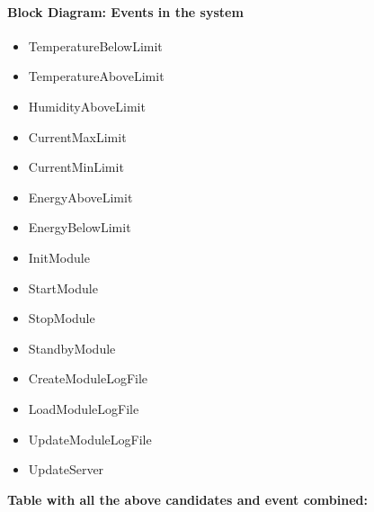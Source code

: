 			\paragraph{Block Diagram: Events in the system}
				\begin{itemize}
					\item TemperatureBelowLimit
					\item TemperatureAboveLimit
					\item HumidityAboveLimit
					\item CurrentMaxLimit
					\item CurrentMinLimit
					\item EnergyAboveLimit
					\item EnergyBelowLimit
					\item InitModule
					\item StartModule
					\item StopModule
					\item StandbyModule
					\item CreateModuleLogFile
					\item LoadModuleLogFile
					\item UpdateModuleLogFile
					\item UpdateServer
				\end{itemize}
				\textbf{Table with all the above candidates and event combined:}
